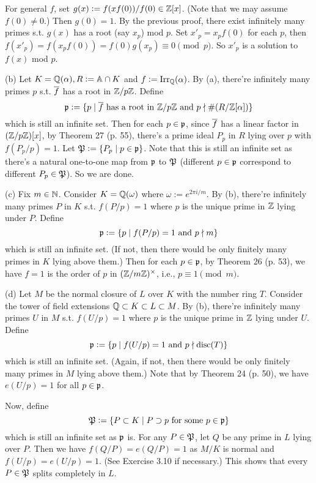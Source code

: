 \documentclass[../Marcus.tex]{subfiles}
\begin{document}
For general $f$, set $g(x):=f(xf(0))/f(0)\in\mathbb{Z}[x]$. (Note that we may assume $f(0)\neq0$.) Then $g(0)=1$. By the previous proof, there exist infinitely many primes s.t. $g(x)$ has a root (say $x_p$) mod $p$. Set $x'_p=x_pf(0)$ for each $p$, then $f(x'_p)=f(x_pf(0))=f(0)g(x_p)\equiv 0\pmod{p}$. So $x'_p$ is a solution to $f(x)$ mod $p$.

(b) Let $K=\mathbb{Q}(\alpha),R:=\mathbb{A}\cap K$ and $f:=\operatorname{Irr}_{\mathbb{Q}}(\alpha)$. By (a), there're infinitely many primes $p$ s.t. $\overline{f}$ has a root in $\mathbb{Z}/p\mathbb{Z}$. Define
$$
\mathfrak{p} := \{p \mid \overline{f} \text{ has a root in } \mathbb{Z}/p\mathbb{Z} \text{ and } p \nmid \#(R/\mathbb{Z}[\alpha]) \}
$$
which is still an infinite set. Then for each $p\in\mathfrak{p}$, since $\overline{f}$ has a linear factor in $(\mathbb{Z}/p\mathbb{Z})[x]$, by Theorem 27 (p. 55), there's a prime ideal $P_p$ in $R$ lying over $p$ with $f(P_p/p)=1$. Let $\mathfrak{P}:=\{P_p \mid p\in\mathfrak{p}\}$. Note that this is still an infinite set as there's a natural one-to-one map from $\mathfrak{p}$ to $\mathfrak{P}$ (different $p\in\mathfrak{p}$ correspond to different $P_p\in\mathfrak{P}$). So we are done.

(c) Fix $m\in\mathbb{N}$. Consider $K=\mathbb{Q}(\omega)$ where $\omega:=e^{2\pi i/m}$. By (b), there're infinitely many primes $P$ in $K$ s.t. $f(P/p)=1$ where $p$ is the unique prime in $\mathbb{Z}$ lying under $P$. Define
$$
\mathfrak{p} := \{p \mid f(P/p) = 1 \text{ and } p \nmid m \}
$$
which is still an infinite set. (If not, then there would be only finitely many primes in $K$ lying above them.) Then for each $p\in\mathfrak{p}$, by Theorem 26 (p. 53), we have $f=1$ is the order of $p$ in $(\mathbb{Z}/m\mathbb{Z})^\times$, i.e., $p\equiv1\pmod{m}$.

(d) Let $M$ be the normal closure of $L$ over $K$ with the number ring $T$. Consider the tower of field extensions $\mathbb{Q} \subset K \subset L \subset M$. By (b), there're infinitely many primes $U$ in $M$ s.t. $f(U/p)=1$ where $p$ is the unique prime in $\mathbb{Z}$ lying under $U$. Define
$$
\mathfrak{p} := \{p \mid f(U/p) = 1 \text{ and } p \nmid \operatorname{disc}(T) \}
$$
which is still an infinite set. (Again, if not, then there would be only finitely many primes in $M$ lying above them.) Note that by Theorem 24 (p. 50), we have $e(U/p)=1$ for all $p\in \mathfrak{p}$.

Now, define
$$
\mathfrak{P} := \{P \subset K \mid P \supset p \text{ for some } p\in\mathfrak{p} \}
$$
which is still an infinite set as $\mathfrak{p}$ is. For any $P\in\mathfrak{P}$, let $Q$ be any prime in $L$ lying over $P$. Then we have $f(Q/P)=e(Q/P)=1$ as $M/K$ is normal and $f(U/p)=e(U/p)=1$. (See Exercise 3.10 if necessary.) This shows that every $P\in\mathfrak{P}$ splits completely in $L$.
\end{document}

